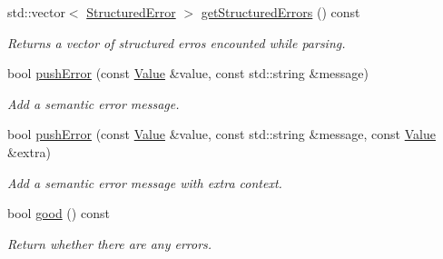 \begin{DoxyCompactItemize}
std\+::vector$<$ \hyperlink{struct_json_1_1_reader_1_1_structured_error}{Structured\+Error} $>$ \hyperlink{class_json_1_1_reader_a08c2ea5ffc7d2a9c9e35020835624f0b}{get\+Structured\+Errors} () const 
\begin{DoxyCompactList}\small\item\em Returns a vector of structured erros encounted while parsing. \end{DoxyCompactList}\item 
bool \hyperlink{class_json_1_1_reader_ade6c28e0ef00d8f2e0aa2283f91c3e37}{push\+Error} (const \hyperlink{class_json_1_1_value}{Value} \&value, const std\+::string \&message)
\begin{DoxyCompactList}\small\item\em Add a semantic error message. \end{DoxyCompactList}\item 
bool \hyperlink{class_json_1_1_reader_a9b474233c3a7c688e340e70665d45223}{push\+Error} (const \hyperlink{class_json_1_1_value}{Value} \&value, const std\+::string \&message, const \hyperlink{class_json_1_1_value}{Value} \&extra)
\begin{DoxyCompactList}\small\item\em Add a semantic error message with extra context. \end{DoxyCompactList}\item 
bool \hyperlink{class_json_1_1_reader_a06b52dcc656549506b1ae6f05167ecf4}{good} () const 
\begin{DoxyCompactList}\small\item\em Return whether there are any errors. \end{DoxyCompactList}\end{DoxyCompactItemize}
